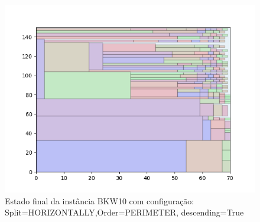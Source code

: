 \begin{figure}[H]
    \centering
    \caption[]{Estado final da instância BKW10 com configuração: Split=HORIZONTALLY,Order=PERIMETER, descending=True}
    \label{fig:bkw10-horizontally-perimeter-true}
    \includegraphics[scale=0.5]{output/figures/bkw/bkw10/horizontally/perimeter/true/000}
\end{figure}